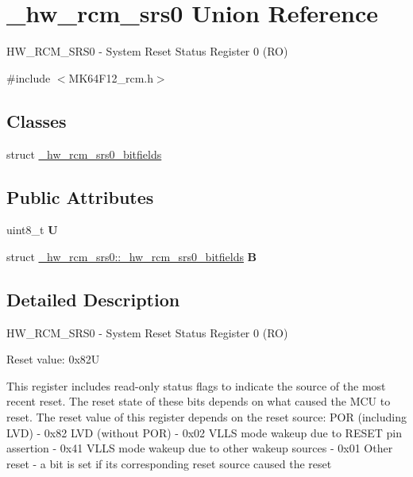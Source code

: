 \hypertarget{union__hw__rcm__srs0}{}\section{\+\_\+hw\+\_\+rcm\+\_\+srs0 Union Reference}
\label{union__hw__rcm__srs0}


H\+W\+\_\+\+R\+C\+M\+\_\+\+S\+R\+S0 -\/ System Reset Status Register 0 (RO)  




{\ttfamily \#include $<$M\+K64\+F12\+\_\+rcm.\+h$>$}

\subsection*{Classes}
\begin{DoxyCompactItemize}
\item 
struct \hyperlink{struct__hw__rcm__srs0_1_1__hw__rcm__srs0__bitfields}{\+\_\+hw\+\_\+rcm\+\_\+srs0\+\_\+bitfields}
\end{DoxyCompactItemize}
\subsection*{Public Attributes}
\begin{DoxyCompactItemize}
\item 
uint8\+\_\+t {\bfseries U}\hypertarget{union__hw__rcm__srs0_ad23f47a4d9fc0193746c97fbaf94baf2}{}\label{union__hw__rcm__srs0_ad23f47a4d9fc0193746c97fbaf94baf2}

\item 
struct \hyperlink{struct__hw__rcm__srs0_1_1__hw__rcm__srs0__bitfields}{\+\_\+hw\+\_\+rcm\+\_\+srs0\+::\+\_\+hw\+\_\+rcm\+\_\+srs0\+\_\+bitfields} {\bfseries B}\hypertarget{union__hw__rcm__srs0_ae21e1cc455a0c4d80f09281463c1da60}{}\label{union__hw__rcm__srs0_ae21e1cc455a0c4d80f09281463c1da60}

\end{DoxyCompactItemize}


\subsection{Detailed Description}
H\+W\+\_\+\+R\+C\+M\+\_\+\+S\+R\+S0 -\/ System Reset Status Register 0 (RO) 

Reset value\+: 0x82U

This register includes read-\/only status flags to indicate the source of the most recent reset. The reset state of these bits depends on what caused the M\+CU to reset. The reset value of this register depends on the reset source\+: P\+OR (including L\+VD) -\/ 0x82 L\+VD (without P\+OR) -\/ 0x02 V\+L\+LS mode wakeup due to R\+E\+S\+ET pin assertion -\/ 0x41 V\+L\+LS mode wakeup due to other wakeup sources -\/ 0x01 Other reset -\/ a bit is set if its corresponding reset source caused the reset 


